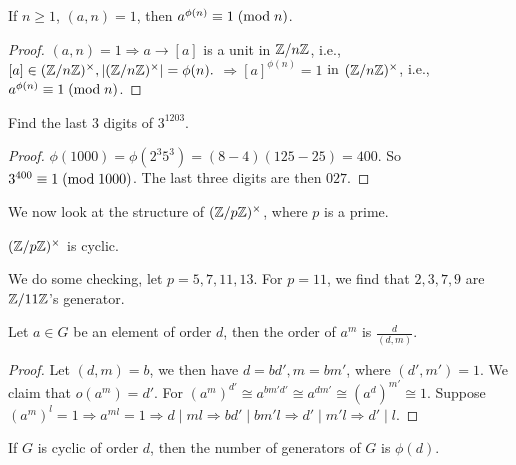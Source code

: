 \begin{corollary}
	If $n\ge1$, $(a,n) = 1$, then $a^{\phi(n)}\equiv 1\;(\mbox{mod}{\;n})$.
\end{corollary}
\begin{proof}
	$(a,n) = 1 \Rightarrow a\rightarrow[a]$ is a unit in $\mathbb{Z}/n\mathbb{Z}$, i.e., $[a]\in(\mathbb{Z}/n\mathbb{Z})^{\times},|(\mathbb{Z}/n\mathbb{Z})^{\times}| = \phi(n).$
	$\Rightarrow [a]^{\phi(n)}=1$ in $(\mathbb{Z}/n\mathbb{Z})^{\times}$,
	i.e., $a^{\phi(n)}\equiv 1\;(\mbox{mod}{\;n})$.
\end{proof}
\begin{exercise}
	Find the last $3$ digits of $3^{1203}$.
\end{exercise}
\begin{proof}
	$\phi(1000) = \phi(2^3 5^3) = (8-4)(125-25) = 400$. So $3^{400}\equiv 1\;(\mbox{mod}{\;1000})$. The last three digits are then $027$.
\end{proof}
We now look at the structure of $(\mathbb{Z}/p\mathbb{Z})^{\times}$, where $p$ is a prime.
\begin{theorem}
	$(\mathbb{Z}/p\mathbb{Z})^{\times}$ is cyclic.
\end{theorem}
We do some checking, let $p=5,7,11,13$. For $p=11$, we find that $2,3,7,9$ are $\mathbb{Z}/11\mathbb{Z}$'s generator.
\begin{lemma}
	Let $a\in G$ be an element of order $d$, then the order of $a^m$ is $\frac{d}{(d,m)}$.
\end{lemma}
\begin{proof}
	Let $(d,m) = b$, we then have $d = bd', m = bm'$, where $(d',m') = 1$. We claim that $o(a^m) = d'$. For $(a^m)^{d'} \cong a^{bm'd'}\cong a^{dm'}\cong (a^d)^{m'}\cong 1$. Suppose $(a^m)^{l} = 1\Rightarrow a^{ml} = 1\Rightarrow d\mid ml \Rightarrow bd'\mid bm'l \Rightarrow d'\mid m' l\Rightarrow d'\mid l$.
\end{proof}
\begin{corollary}
	If $G$ is cyclic of order $d$, then the number of generators of $G$ is $\phi(d)$.
\end{corollary}

